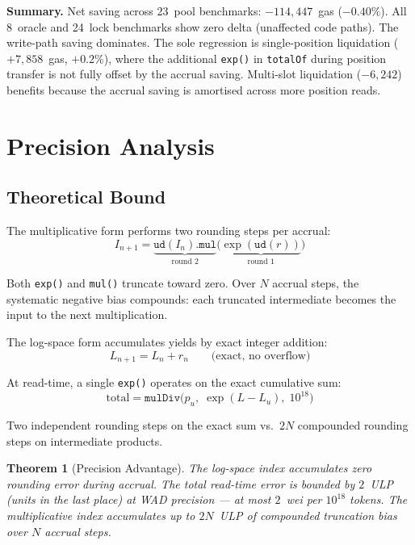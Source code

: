 \documentclass[10pt,a4paper,twocolumn]{article}
\theoremstyle{definition}
\theoremstyle{plain}
\newtheorem{theorem}{Theorem}[section]
\theoremstyle{remark}
\begin{document}
\textbf{Summary.} Net saving across 23~pool benchmarks: $-114{,}447$~gas ($-0.40\%$). All 8~oracle and 24~lock benchmarks show zero delta (unaffected code paths). The write-path saving dominates. The sole regression is single-position liquidation ($+7{,}858$~gas, $+0.2\%$), where the additional \texttt{exp()} in \texttt{totalOf} during position transfer is not fully offset by the accrual saving. Multi-slot liquidation ($-6{,}242$) benefits because the accrual saving is amortised across more position reads.

\section{Precision Analysis}
\label{sec:precision}

\subsection{Theoretical Bound}
\label{subsec:precision-theory}

The multiplicative form performs two rounding steps per accrual:
\begin{equation}
I_{n+1} = \underbrace{\texttt{ud}(I_n).\texttt{mul}}_{\text{round 2}}\bigl(\underbrace{\exp(\texttt{ud}(r))}_{\text{round 1}}\bigr)
\end{equation}

Both \texttt{exp()} and \texttt{mul()} truncate toward zero. Over $N$ accrual steps, the systematic negative bias compounds: each truncated intermediate becomes the input to the next multiplication.

The log-space form accumulates yields by exact integer addition:
\begin{equation}
L_{n+1} = L_n + r_n \qquad \text{(exact, no overflow)}
\end{equation}

At read-time, a single \texttt{exp()} operates on the exact cumulative sum:
\begin{equation}
\text{total} = \texttt{mulDiv}\bigl(p_u,\; \exp(L - L_u),\; 10^{18}\bigr)
\end{equation}

Two independent rounding steps on the exact sum vs.\ $2N$ compounded rounding steps on intermediate products.

\begin{theorem}[Precision Advantage]
\label{thm:precision}
The log-space index accumulates zero rounding error during accrual. The total read-time error is bounded by $2$~ULP (units in the last place) at WAD precision --- at most $2$~wei per $10^{18}$ tokens. The multiplicative index accumulates up to $2N$~ULP of compounded truncation bias over $N$ accrual steps.
\end{theorem}
\end{document}
